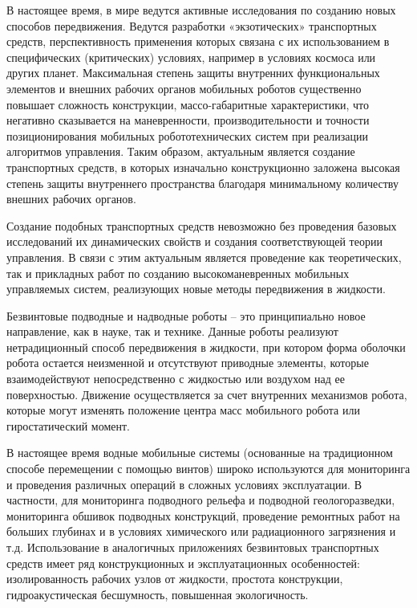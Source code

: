
{\actuality} 

В настоящее время, в мире ведутся активные исследования по созданию новых способов передвижения. Ведутся разработки «экзотических» транспортных средств, перспективность применения которых связана с их использованием в специфических (критических) условиях, например в условиях космоса или других планет. Максимальная степень защиты внутренних функциональных элементов и внешних рабочих органов мобильных роботов существенно повышает сложность конструкции, массо-габаритные характеристики, что негативно сказывается на маневренности, производительности и точности позиционирования мобильных робототехнических систем при реализации алгоритмов управления. Таким образом, актуальным является создание транспортных средств, в которых изначально конструкционно заложена высокая степень защиты внутреннего пространства благодаря минимальному количеству внешних рабочих органов.

Создание подобных транспортных средств невозможно без проведения базовых исследований их динамических свойств и создания соответствующей теории управления. В связи с этим актуальным является проведение как теоретических, так и прикладных работ по созданию высокоманевренных мобильных управляемых систем, реализующих новые методы передвижения в жидкости.

Безвинтовые подводные и надводные роботы – это принципиально новое направление, как в науке, так и технике. Данные роботы реализуют нетрадиционный способ передвижения в жидкости, при котором форма оболочки робота остается неизменной и отсутствуют приводные элементы, которые взаимодействуют непосредственно с жидкостью или воздухом над ее поверхностью. Движение осуществляется за счет внутренних механизмов робота, которые могут изменять положение центра масс мобильного робота или гиростатический момент. 

В настоящее время водные мобильные системы (основанные на традиционном способе перемещении с помощью винтов) широко используются для мониторинга и проведения различных операций в сложных условиях эксплуатации. В частности, для мониторинга подводного рельефа и подводной геологоразведки, мониторинга обшивок подводных конструкций, проведение ремонтных работ на больших глубинах и в условиях химического или радиационного загрязнения и т.д. Использование в аналогичных приложениях безвинтовых транспортных средств имеет ряд конструкционных и эксплуатационных особенностей: изолированность рабочих узлов от жидкости, простота конструкции, гидроакустическая бесшумность, повышенная экологичность.


